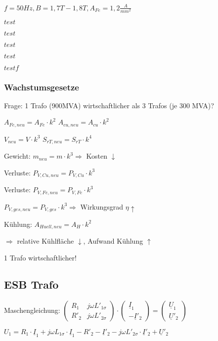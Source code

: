 \documentclass[a4paper,11pt]{article}
\begin{document}
	$f = 50Hz, B = 1,7 T - 1,8 T, A_{Fe} = 1,2 \frac{A}{mm^{2}}$
	
	$test$

	$test$

	$ test $

	$ test $

	$test f$
	\subsubsection{Wachstumsgesetze}

	Frage: 1 Trafo (900MVA) wirtschaftlicher als 3 Trafos (je 300 MVA)?

	$A_{Fe,neu} = A_{Fe} \cdot k^2$ \quad $A_{cu,neu} = A_{cu} \cdot k^2$ \quad

	$V_{neu} = V \cdot k^3$ \quad $S_{rT,neu} = S_{rT} \cdot k^4$

	Gewicht: $m_{neu} = m \cdot k^3 \Rightarrow$ Kosten $\downarrow$ 

	Verluste: $P_{V,Cu,neu} = P_{V,Cu} \cdot k^3$

	Verluste: $P_{V,Fe,neu} = P_{V,Fe} \cdot k^3$

	$P_{V,ges,neu} = P_{V,ges} \cdot k^3 \Rightarrow$ Wirkungsgrad $\eta \uparrow$

	Kühlung: $A_{Huell,neu} = A_H \cdot k^2$ 

	$\Rightarrow$ relative Kühlfläche $\downarrow$, Aufwand Kühlung $\uparrow$

	1 Trafo wirtschaftlicher!



	
	\subsection{ESB Trafo}

	Maschengleichung:
	$
	\begin{pmatrix}
		R_{1} & j\omega L'_{1\sigma} \\
		R'_{2} & j\omega L'_{2\sigma}
	\end{pmatrix} \cdot
	\begin{pmatrix}
		\underline{I}_{1} \\
		-\underline{I}'_{2}
	\end{pmatrix} =
	\begin{pmatrix}
		\underline{U}_{1} \\
		\underline{U}'_{2}
	\end{pmatrix}
	$

	$U_{1} = R_{1} \cdot \underline{I}_{1} + j\omega L_{1\sigma} \cdot \underline{I}_{1} - R'_{2}- \underline{I}'_{2}-j\omega L'_{2\sigma} \cdot \underline{I}'_{2}+ \underline{U}'_{2}$
\end{document}
